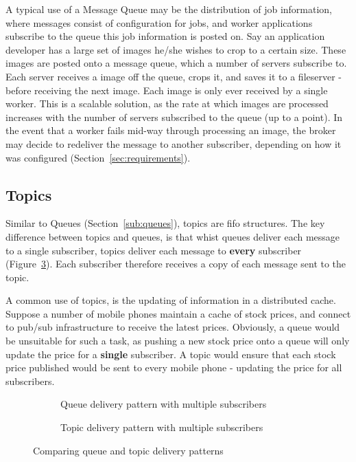 A typical use of a Message Queue may be the distribution of job information,
where messages consist of configuration for jobs, and worker applications
subscribe to the queue this job information is posted on. Say an application
developer has a large set of images he/she wishes to crop to a certain size.
These images are posted onto a message queue, which a number of servers
subscribe to. Each server receives a image off the queue, crops it, and saves it
to a fileserver - before receiving the next image. Each image is only ever
received by a single worker. This is a scalable solution, as the rate at which
images are processed increases with the number of servers subscribed to the
queue (up to a point). In the event that a worker fails mid-way through
processing an image, the broker may decide to redeliver the message to another
subscriber, depending on how it was configured (Section~\ref{sec:requirements}).

\subsection{Topics}
\label{sub:topics}

Similar to Queues (Section~\ref{sub:queues}), topics are \gls{fifo} structures.
The key difference between topics and queues, is that whist queues deliver each
message to a single subscriber, topics deliver each message to \textbf{every}
subscriber (Figure~\ref{fig:tikz:queueVsTopic}). Each subscriber therefore
receives a copy of each message sent to the topic.

A common use of topics, is the updating of information in a distributed cache.
Suppose a number of mobile phones maintain a cache of stock prices, and
connect to pub/sub infrastructure to receive the latest prices. Obviously, a
queue would be unsuitable for such a task, as pushing a new stock price onto a
queue will only update the price for a \textbf{single} subscriber. A topic
would ensure that each stock price published would be sent to every mobile phone -
updating the price for all subscribers.

\begin{figure}[htbp]
  \centering
  \begin{subfigure}[t]{0.5\textwidth}
    \centering
    
    \caption{Queue delivery pattern with multiple subscribers}
    \label{fig:tikz:messageBrokerQueue}
  \end{subfigure}

  \begin{subfigure}[t]{0.5\textwidth}
    \centering
    
    \caption{Topic delivery pattern with multiple subscribers}
    \label{fig:tikz:messageBrokerTopic}
  \end{subfigure}
  \caption{Comparing queue and topic delivery patterns}
  \label{fig:tikz:queueVsTopic}
\end{figure}

